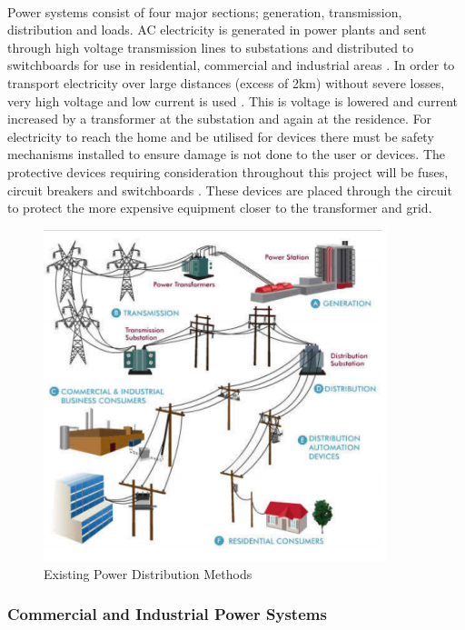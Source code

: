 \paragraph{}
Power systems consist of four major sections; generation, transmission, distribution and loads. AC electricity is generated in power plants and sent through high voltage transmission lines to substations and distributed to switchboards for use in residential, commercial and industrial areas \cite{Amin2011}. In order to transport electricity over large distances (excess of 2km) without severe losses, very high voltage and low current is used \cite{Amin2011}. This is voltage is lowered and current increased by a transformer at the substation and again at the residence. For electricity to reach the home and be utilised for devices there must be safety mechanisms installed to ensure damage is not done to the user or devices. The protective devices requiring consideration throughout this project will be fuses, circuit breakers and switchboards \cite{UnitedStatesDepartmentoftheInterior2000}. These devices are placed through the circuit to protect the more expensive equipment closer to the transformer and grid.  

\begin{figure}[H]
\hfill\includegraphics[width = 100mm]{images/Power_Distro}\hspace*{\fill}
\caption{Existing Power Distribution Methods \cite{Active2015}}
\label{fig:ExistingPower}
\end{figure}

\subsubsection{Commercial and Industrial Power Systems}

